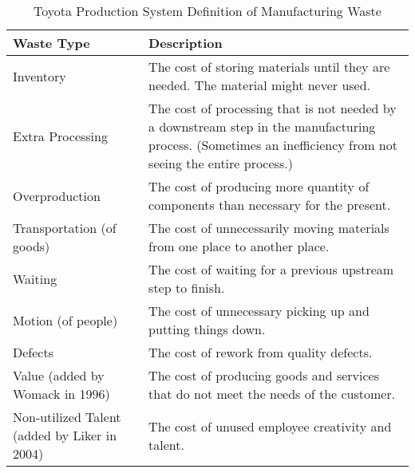 \begin{table}[t]
\renewcommand{\arraystretch}{1.5}
\centering
\caption{Toyota Production System Definition of Manufacturing Waste}
\label{ManufacturingWaste}
\begin{tabular}{| >{\raggedright}m{1.15in}|p{2.00in}|}
\hline
Waste Type                & Description                                                                                                                                                  \\ \hline
Inventory                 & The cost of storing materials until they are needed. The material might never used.                                                                   \\ \hline
Extra Processing          & The cost of processing that is not needed by a downstream step in the manufacturing process. (Sometimes an inefficiency from not seeing the entire process.) \\ \hline
Overproduction            & The cost of producing more quantity of components than necessary for the present.                                                                            \\ \hline
Transportation (of goods) & The cost of unnecessarily moving materials from one place to another place.                                                                                  \\ \hline
Waiting                   & The cost of waiting for a previous upstream step to finish.                                                                                                       \\ \hline
Motion (of people)        & The cost of unnecessary picking up and putting things down.                                                                                                  \\ \hline
Defects                   & The cost of rework from quality defects.                                                                                                                     \\ \hline
Value (added by Womack in 1996)                     & The cost of producing goods and services that do not meet the needs of the customer.                                                                         \\ \hline
Non-utilized Talent (added by Liker in 2004)      & The cost of unused employee creativity and talent.                                                                                                           \\ \hline
\end{tabular}
\end{table}




